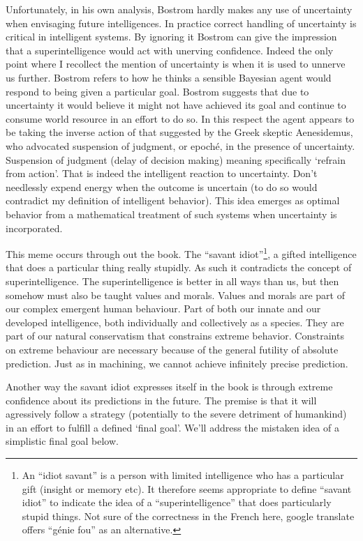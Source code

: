 \documentclass[a4paper]{caesar_book}
\begin{document}
Unfortunately, in his own analysis, Bostrom hardly makes any use of uncertainty when envisaging future intelligences. In practice correct handling of uncertainty is critical in intelligent systems. By ignoring it Bostrom can give the impression that a superintelligence would act with unerving confidence. Indeed the only point where I recollect the mention of uncertainty is when it is used to unnerve us further. Bostrom refers to how he thinks a sensible Bayesian agent would respond to being given a particular goal. Bostrom suggests that due to uncertainty it would believe it might not have achieved its goal and continue to consume world resource in an effort to do so. In this respect the agent appears to be taking the inverse action of that suggested by the Greek skeptic Aenesidemus, who advocated suspension of judgment, or epoché, in the presence of uncertainty. Suspension of judgment (delay of decision making) meaning specifically ‘refrain from action’. That is indeed the intelligent reaction to uncertainty. Don’t needlessly expend energy when the outcome is uncertain (to do so would contradict my definition of intelligent behavior). This idea emerges as optimal behavior from a mathematical treatment of such systems when uncertainty is incorporated.

This meme occurs through out the book. The ``savant idiot''\footnote{An ``idiot savant'' is a person with limited intelligence who has a particular gift (insight or memory etc). It therefore seems appropriate to define “savant idiot” to indicate the idea of a “superintelligence” that does particularly stupid things. Not sure of the correctness in the French here, google translate offers “génie fou” as an alternative.}, a gifted intelligence that does a particular thing really stupidly. As such it contradicts the concept of superintelligence. The superintelligence is better in all ways than us, but then somehow must also be taught values and morals. Values and morals are part of our complex emergent human behaviour. Part of both our innate and our developed intelligence, both individually and collectively as a species. They are part of our natural conservatism that constrains extreme behavior. Constraints on extreme behaviour are necessary because of the general futility of absolute prediction. Just as in machining, we cannot achieve infinitely precise prediction.

Another way the savant idiot expresses itself in the book is through extreme confidence about its predictions in the future. The premise is that it will agressively follow a strategy (potentially to the severe detriment of humankind) in an effort to fulfill a defined ‘final goal’. We’ll address the mistaken idea of a simplistic final goal below.
\end{document}
